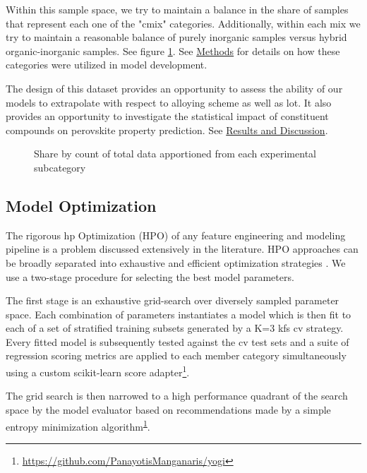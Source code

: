 \documentclass[aip, jmp, amsmath, amssymb, nofootinbib]{revtex4-2}
\begin{document}
Within this sample space, we try to maintain a balance in the share of
samples that represent each one of the "\gls{cmix}"
categories. Additionally, within each mix we try to maintain a
reasonable balance of purely inorganic samples versus hybrid
organic-inorganic samples. See figure \ref{fig:lot_mix_org}. See \hyperref[sec:org7884545]{Methods}
for details on how these categories were utilized in model
development.

The design of this dataset provides an opportunity to assess the
ability of our models to extrapolate with respect to alloying scheme
as well as \gls{lot}. It also provides an opportunity to
investigate the statistical impact of constituent compounds on
perovskite property prediction. See \hyperref[sec:org9df7bc6]{Results and Discussion}.

 
\begin{figure}[htbp]
\centering

\caption{\label{fig:lot_mix_org} Share by count of total data apportioned from each experimental subcategory}
\end{figure}

\subsection*{Model Optimization}
\label{sec:orge5c1912}
The rigorous \gls{hp} Optimization (HPO) of any feature
engineering and modeling pipeline is a problem discussed extensively
in the literature. HPO approaches can be broadly separated into
exhaustive and efficient optimization strategies
\cite{yang-2020-hyper-optim}. We use a two-stage procedure for
selecting the best model parameters.

The first stage is an exhaustive grid-search over diversely sampled
parameter space. Each combination of parameters instantiates a model
which is then fit to each of a set of stratified training subsets
generated by a K=3 \gls{kfs} \gls{cv} strategy. Every
fitted model is subsequently tested against the \gls{cv} test
sets and a suite of regression scoring metrics are applied to each
member category simultaneously using a custom scikit-learn score
adapter\footnote{\url{https://github.com/PanayotisManganaris/yogi}\label{orgda4b78a}}.

The grid search is then narrowed to a high performance quadrant of the
search space by the model evaluator based on recommendations made by a
simple entropy minimization algorithm\textsuperscript{\ref{orgda4b78a}}.
\end{document}
